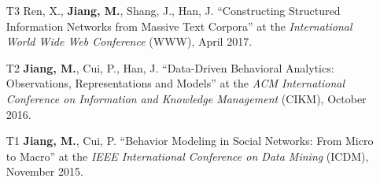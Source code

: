 \documentclass[10pt]{article}
\newenvironment{myindentpar}[1]%
{\begin{list}{}%
         {\setlength{\leftmargin}{#1}}%
         \item[]%
}
{\end{list}}
\newcounter{list}
\begin{document}
\begin{myindentpar}{0.00cm}
\begin{enumerate}[leftmargin=.5cm]
\item[T3] Ren, X., \textbf{Jiang, M.}, Shang, J., Han, J. ``Constructing Structured Information Networks from Massive Text Corpora'' at the \textit{International World Wide Web Conference}  (WWW), April 2017.

\item[T2] \textbf{Jiang, M.}, Cui, P., Han, J. ``Data-Driven Behavioral Analytics: Observations, Representations and Models'' at the \textit{ACM International Conference on Information and Knowledge Management} (CIKM), October 2016.
		
\item[T1] \textbf{Jiang, M.}, Cui, P. ``Behavior Modeling in Social Networks: From Micro to Macro'' at the \textit{IEEE International Conference on Data Mining} (ICDM), November 2015.

\end{enumerate}

\end{myindentpar}

	

		


\end{document}
